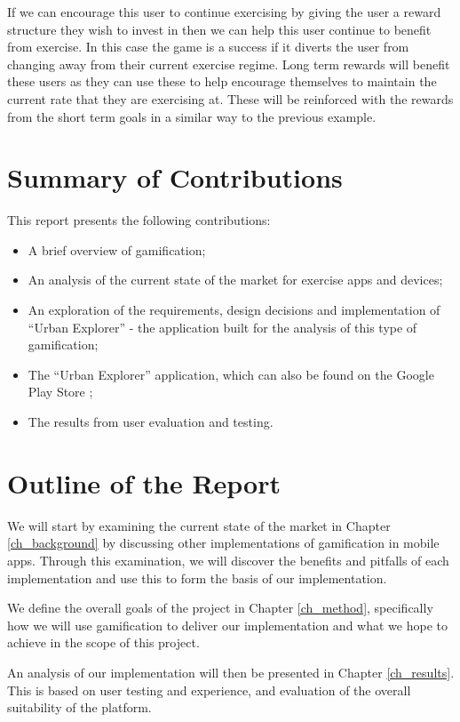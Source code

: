 If we can encourage this user to continue exercising by giving the
user a reward structure they wish to invest in then we can help this
user continue to benefit from exercise. In this case the game is a
success if it diverts the user from changing away from their current
exercise regime. Long term rewards will benefit these users as they
can use these to help encourage themselves to maintain the current
rate that they are exercising at. These will be reinforced with the
rewards from the short term goals in a similar way to the previous
example. 

\section{Summary of Contributions}

This report presents the following contributions: 

\begin{itemize}
  \item A brief overview of gamification;
  \item An analysis of the current state of the market for exercise
    apps and devices;
  \item An exploration of the requirements, design decisions and
    implementation of ``Urban Explorer'' - the application built for
    the analysis of this type of gamification;
  \item The ``Urban Explorer'' application, which can also be found on
    the Google Play Store \cite{app_store_link};
  \item The results from user evaluation and testing.
\end{itemize}

\section{Outline of the Report}

We will start by examining the current state of the market in Chapter
\ref{ch_background} by
discussing other implementations of gamification in mobile
apps. Through this examination, we will discover the benefits and
pitfalls of each implementation and use this to form the basis of our
implementation. 

We define the overall goals of the project in Chapter \ref{ch_method},
specifically how we will use gamification to deliver our
implementation and what we hope to achieve in the scope of this
project.

An analysis of our implementation will then be presented in Chapter
\ref{ch_results}. This is based on user testing and experience, and evaluation of the
overall suitability of the platform.
